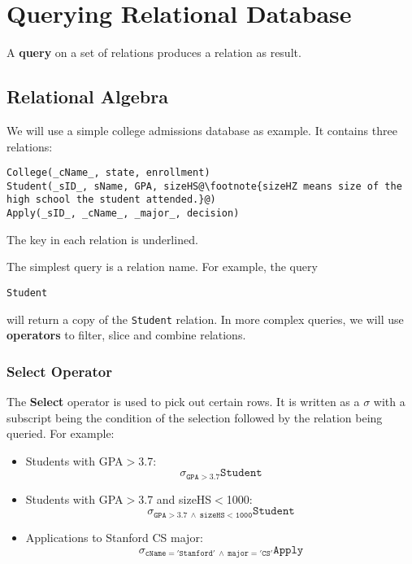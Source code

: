 \ifx\PREAMBLE\undefined


\fi
\chapter{Querying Relational Database}
A \textbf{query} on a set of relations produces a relation as result.
\section{Relational Algebra}
We will use a simple college admissions database as example. It contains three relations:
\begin{lstlisting}[escapechar=@]
College(_cName_, state, enrollment)
Student(_sID_, sName, GPA, sizeHS@\footnote{sizeHZ means size of the high school the student attended.}@)
Apply(_sID_, _cName_, _major_, decision)
\end{lstlisting}
The key in each relation is underlined.

The simplest query is a relation name. For example, the query
\begin{center}
\texttt{Student}
\end{center}
will return a copy of the \texttt{Student} relation. In more complex queries, we will use \textbf{operators} to filter, slice and combine relations.
\subsection{Select Operator}
The \textbf{Select} operator is used to pick out certain rows. It is written as a $\sigma$ with a subscript being the condition of the selection followed by the relation being queried. For example:
\begin{itemize}
\item Students with GPA$>$3.7: $$\mathtt{\sigma_{GPA>3.7}Student}$$
\item Students with GPA$>$3.7 and sizeHS$<$1000: $$\mathtt{\sigma_{GPA>3.7\:\land\: sizeHS<1000}Student}$$
\item Applications to Stanford CS major: $$\mathtt{\sigma_{cName='Stanford'\:\land\: major='CS'}Apply}$$
\end{itemize}
